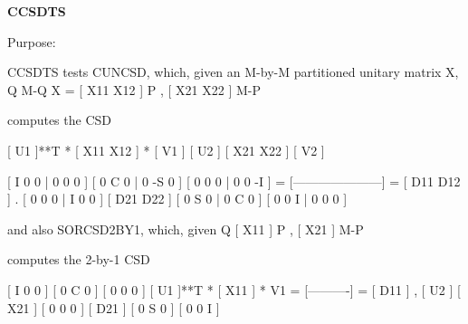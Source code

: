 {\bfseries C\+C\+S\+D\+T\+S} 

\begin{DoxyParagraph}{Purpose\+: }
\begin{DoxyVerb} CCSDTS tests CUNCSD, which, given an M-by-M partitioned unitary
 matrix X,
              Q  M-Q
       X = [ X11 X12 ] P   ,
           [ X21 X22 ] M-P

 computes the CSD

       [ U1    ]**T * [ X11 X12 ] * [ V1    ]
       [    U2 ]      [ X21 X22 ]   [    V2 ]

                             [  I  0  0 |  0  0  0 ]
                             [  0  C  0 |  0 -S  0 ]
                             [  0  0  0 |  0  0 -I ]
                           = [---------------------] = [ D11 D12 ] .
                             [  0  0  0 |  I  0  0 ]   [ D21 D22 ]
                             [  0  S  0 |  0  C  0 ]
                             [  0  0  I |  0  0  0 ]

 and also SORCSD2BY1, which, given
          Q
       [ X11 ] P   ,
       [ X21 ] M-P

 computes the 2-by-1 CSD

                                     [  I  0  0 ]
                                     [  0  C  0 ]
                                     [  0  0  0 ]
       [ U1    ]**T * [ X11 ] * V1 = [----------] = [ D11 ] ,
       [    U2 ]      [ X21 ]        [  0  0  0 ]   [ D21 ]
                                     [  0  S  0 ]
                                     [  0  0  I ]\end{DoxyVerb}
 
\end{DoxyParagraph}

